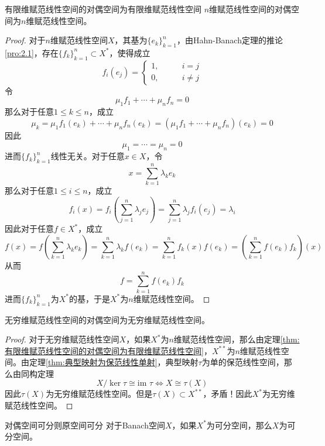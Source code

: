 \documentclass[lang = cn, scheme = chinese, thmcnt = section]{elegantbook}
\newcommand{\sub}{\subset}             %
\newcommand{\im}{\text{im }}           %
\begin{document}
\begin{theorem}{}{有限维赋范线性空间的对偶空间为有限维赋范线性空间}
	$n$维赋范线性空间的对偶空间为$n$维赋范线性空间。
\end{theorem}

\begin{proof}
	对于$n$维赋范线性空间$X$，其基为$\{e_k\}_{k=1}^{n}$，由Hahn-Banach定理的推论\ref{pro:2.1}，存在$\{f_k\}_{k=1}^{n}\sub X^*$，使得成立
	$$
	f_i(e_j)=\begin{cases}
		1,\qquad & i=j\\
		0,\qquad & i\ne j
	\end{cases}
	$$
	令
	$$
	\mu_1f_1+\cdots+\mu_nf_n=0
	$$
	那么对于任意$1\le k \le n$，成立
	$$
	\mu_k
	=\mu_1f_1(e_k)+\cdots+\mu_nf_n(e_k)
	=(\mu_1f_1+\cdots+\mu_nf_n)(e_k)=0
	$$
	因此
	$$
	\mu_1=\cdots=\mu_n=0
	$$
	进而$\{f_k\}_{k=1}^{n}$线性无关。对于任意$x\in X$，令
	$$
	x=\sum_{k=1}^{n}\lambda_ke_k
	$$
	那么对于任意$1\le i \le n$，成立
	$$
	f_i(x)
	= f_i\left(\sum_{j=1}^{n}\lambda_je_j\right)
	= \sum_{j=1}^{n}\lambda_jf_i(e_j)
	= \lambda_i
	$$
	因此对于任意$f\in X^*$，成立
	$$
	f(x)
	= f\left(\sum_{k=1}^{n}\lambda_ke_k\right)
	= \sum_{k=1}^{n}\lambda_kf(e_k)
	= \sum_{k=1}^{n}f_k(x)f(e_k)
	= \left(\sum_{k=1}^{n}f(e_k)f_k\right)(x)
	$$
	从而
	$$
	f=\sum_{k=1}^{n}f(e_k)f_k
	$$
	进而$\{f_k\}_{k=1}^{n}$为$X^*$的基，于是$X^*$为$n$维赋范线性空间。
\end{proof}

\begin{corollary}
	无穷维赋范线性空间的对偶空间为无穷维赋范线性空间。
\end{corollary}

\begin{proof}
	对于无穷维赋范线性空间$X$，如果$X^*$为$n$维赋范线性空间，那么由定理\ref{thm:有限维赋范线性空间的对偶空间为有限维赋范线性空间}，$X^{**}$为$n$维赋范线性空间。由定理\ref{thm:典型映射为保范线性单射}，典型映射$\tau$为单的保范线性空间，那么由同构定理
	$$
	X/\ker\tau\cong\im\tau\iff X\cong \tau(X)
	$$
	因此$\tau(X)$为无穷维赋范线性空间。但是$\tau(X)\sub X^{**}$，矛盾！因此$X^*$为无穷维赋范线性空间。
\end{proof}

\begin{theorem}{}{对偶空间可分则原空间可分}
	对于Banach空间$X$，如果$X^*$为可分空间，那么$X$为可分空间。
\end{theorem}
\end{document}
